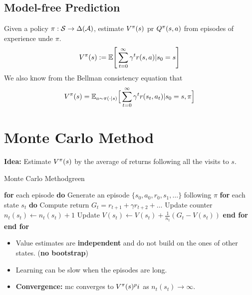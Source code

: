 \subsection{Model-free Prediction}

Given a policy $\pi: \mathcal{S} \rightarrow \Delta(\mathcal{A})$, estimate $V^\pi(s)$ pr $Q^\pi(s,a)$ from episodes of experience unde $\pi$.
\begin{equation*}
    V^\pi(s) := \mathbb{E}\Bigg[\sum_{t=0}^\infty\gamma^tr(s,a)|s_0=s\Bigg] 
\end{equation*}
We also know from the Bellman consistency equation that 
\begin{equation*}
    V^\pi(s) = \mathbb{E}_{a\sim\pi(\cdot | s)}\Big[\sum_{t=0}^\infty\gamma^tr(s_t,a_t)|s_0=s,\pi\Big]
\end{equation*}


\section{Monte Carlo Method}
\textbf{Idea: }Estimate $V^\pi(s)$ by the average of returns following all the visits to $s$.

\begin{mybox}{Monte Carlo Method}{green}
    \begin{algorithmic}[1]
        \STATE \textbf{for} each episode \textbf{do}
        \STATE \hspace{0.5cm} Generate an episode $\{s_0,a_0,r_0,s_1,\dots\}$ following $\pi$
        \STATE \hspace{0.5cm} \textbf{for} each state $s_t$ \textbf{do}
        \STATE \hspace{1cm} Compute return $G_t = r_{t+1} + \gamma r_{t+2}+ \dots$
        \STATE \hspace{1cm} Update counter $n_t(s_t)\leftarrow n_t(s_t)+1$
        \STATE \hspace{1cm} Update $V(s_t)\leftarrow V(s_t) + \frac{1}{n_t}(G_t-V(s_t))$
        \STATE \hspace{0.5cm} \textbf{end for}
        \STATE \textbf{end for}
    \end{algorithmic}
\end{mybox}

\begin{itemize}
    \item Value estimates are \textbf{independent} and do not build on the ones of other states. (\textbf{no bootstrap})
    \item Learning can be slow when the episodes are long.
    \item \textbf{Convergence: }\gls{mc} converges to $V^\pi(s)^pi$ as $n_t(s_t) \rightarrow \infty$.
\end{itemize}

